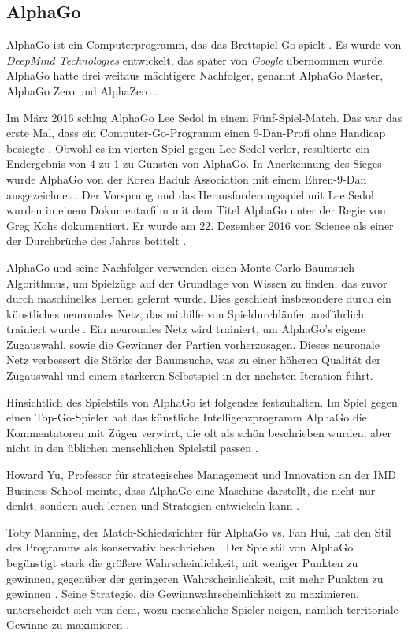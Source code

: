 \subsection{AlphaGo}
\label{secAlphaGo}
AlphaGo ist ein Computerprogramm, das das Brettspiel \glqq{}Go\grqq{} spielt \cite{BBC_NewsGo}. Es wurde von \textit{DeepMind Technologies} entwickelt, das später von \textit{Google} übernommen wurde. AlphaGo hatte drei weitaus mächtigere Nachfolger, genannt AlphaGo Master, AlphaGo Zero und AlphaZero \cite{DeepMind}.

Im März 2016 schlug AlphaGo Lee Sedol in einem Fünf-Spiel-Match. Das war das erste Mal, dass ein Computer-Go-Programm einen 9-Dan-Profi ohne Handicap besiegte \cite{AlphaGoMatch}. Obwohl es im vierten Spiel gegen Lee Sedol verlor, resultierte ein Endergebnis von 4 zu 1 zu Gunsten von AlphaGo. In Anerkennung des Sieges wurde AlphaGo von der Korea Baduk Association mit einem Ehren-9-Dan ausgezeichnet \cite{AlphaGoDan}. Der Vorsprung und das Herausforderungsspiel mit Lee Sedol wurden in einem Dokumentarfilm mit dem Titel AlphaGo \cite{AlphaGoFilm} unter der Regie von Greg Kohs dokumentiert. Er wurde am 22. Dezember 2016 von Science als einer der Durchbrüche des Jahres betitelt \cite{Science2016}.

AlphaGo und seine Nachfolger verwenden einen Monte Carlo Baumsuch-Algorithmus, um Spielzüge auf der Grundlage von Wissen zu finden, das zuvor durch maschinelles Lernen \glqq{}gelernt\grqq{} wurde. Dies geschieht insbesondere durch ein künstliches neuronales Netz, das mithilfe von Spieldurchläufen ausführlich trainiert wurde \cite{Silver_2016}. Ein neuronales Netz wird trainiert, um AlphaGo's eigene Zugauswahl, sowie die Gewinner der Partien vorherzusagen. Dieses neuronale Netz verbessert die Stärke der Baumsuche, was zu einer höheren Qualität der Zugauswahl und einem stärkeren Selbstspiel in der nächsten Iteration führt.

Hinsichtlich des Spielstils von AlphaGo ist folgendes festzuhalten. Im Spiel gegen einen Top-Go-Spieler hat das künstliche Intelligenzprogramm AlphaGo die Kommentatoren mit Zügen verwirrt, die oft als \glqq{}schön\grqq{} beschrieben wurden, aber nicht in den üblichen menschlichen Spielstil passen \cite{Ribeiro2016}.

Howard Yu, Professor für strategisches Management und Innovation an der IMD Business School meinte, dass AlphaGo  eine Maschine darstellt, die nicht nur denkt, sondern auch lernen und Strategien entwickeln kann \cite{Ribeiro2016}.

Toby Manning, der Match-Schiedsrichter für AlphaGo vs. Fan Hui, hat den Stil des Programms als \glqq{}konservativ\grqq{} beschrieben \cite{Gibney2016}. Der Spielstil von AlphaGo begünstigt stark die größere Wahrscheinlichkeit, mit weniger Punkten zu gewinnen, gegenüber der geringeren Wahrscheinlichkeit, mit mehr Punkten zu gewinnen \cite{Ribeiro2016}. Seine Strategie, die Gewinnwahrscheinlichkeit zu maximieren, unterscheidet sich von dem, wozu menschliche Spieler neigen, nämlich territoriale Gewinne zu maximieren \cite{Chouard2016}.

